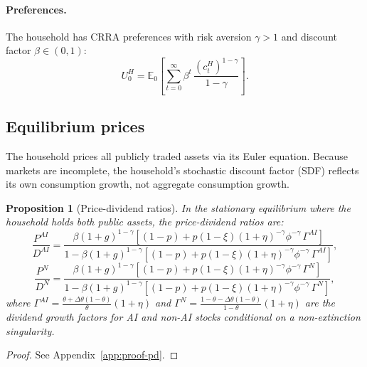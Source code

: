 \documentclass[12pt]{article}
\newtheorem{proposition}{Proposition}
\begin{document}
\paragraph{Preferences.}
The household has CRRA preferences with risk aversion $\gamma > 1$ and discount factor $\beta \in (0,1)$:
%
\begin{equation}
U_0^H = \mathbb{E}_0 \left[ \sum_{t=0}^{\infty} \beta^t \, \frac{(c_t^H)^{1-\gamma}}{1 - \gamma} \right]. \label{eq:utility}
\end{equation}

\subsection{Equilibrium prices} %

The household prices all publicly traded assets via its Euler equation. Because markets are incomplete, the household's stochastic discount factor (SDF) reflects its own consumption growth, not aggregate consumption growth.

\begin{proposition}[Price-dividend ratios] \label{prop:pd-ratios} %
In the stationary equilibrium where the household holds both public assets, the price-dividend ratios are:
%
\begin{equation}
\frac{P^{AI}}{D^{AI}} = \frac{\beta (1+g)^{1-\gamma} \left[ (1-p) + p(1-\xi)(1+\eta)^{-\gamma} \phi^{-\gamma} \, \Gamma^{AI} \right]}{1 - \beta(1+g)^{1-\gamma} \left[ (1-p) + p(1-\xi)(1+\eta)^{-\gamma} \phi^{-\gamma} \, \Gamma^{AI} \right]}, \label{eq:pd-ai}
\end{equation}
%
\begin{equation}
\frac{P^{N}}{D^{N}} = \frac{\beta (1+g)^{1-\gamma} \left[ (1-p) + p(1-\xi)(1+\eta)^{-\gamma} \phi^{-\gamma} \, \Gamma^{N} \right]}{1 - \beta(1+g)^{1-\gamma} \left[ (1-p) + p(1-\xi)(1+\eta)^{-\gamma} \phi^{-\gamma} \, \Gamma^{N} \right]}, \label{eq:pd-nonai}
\end{equation}
%
where $\Gamma^{AI} = \frac{\theta + \Delta\theta(1-\theta)}{\theta} (1+\eta)$ and $\Gamma^{N} = \frac{1 - \theta - \Delta\theta(1-\theta)}{1-\theta} (1+\eta)$ are the dividend growth factors for AI and non-AI stocks conditional on a non-extinction singularity.
\end{proposition}

\begin{proof}
See Appendix~\ref{app:proof-pd}.
\end{proof}
\end{document}
